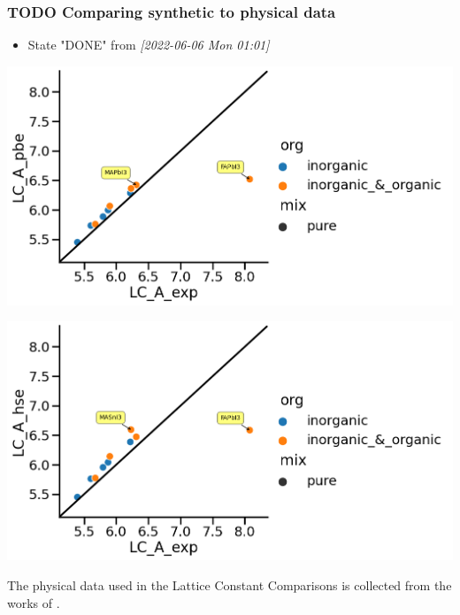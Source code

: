 \documentclass[twoside, twocolumn, 9pt, draft]{article}
\begin{document}
\subsubsection*{{\bfseries\sffamily TODO} Comparing synthetic to physical data}
\label{sec:org58ce9eb}
\begin{itemize}
\item State "DONE"       from              \textit{[2022-06-06 Mon 01:01]}
\end{itemize}
\begin{center}
\includegraphics[width=.9\linewidth]{pbe_v_exp_LC.png}
\end{center}
\begin{center}
\includegraphics[width=.9\linewidth]{hse_v_exp_LC.png}
\end{center}

The physical data used in the Lattice Constant Comparisons is
collected from the works of
\citet{briones-2021-accel-lattic,jiang-2006-predic-lattic,chen-2015-under-spotl}.
\end{document}
